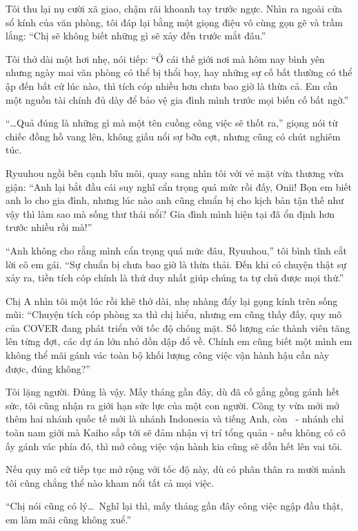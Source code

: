 \documentclass[../main.tex]{subfiles}
\begin{document}
Tôi thu lại nụ cười xã giao, chậm rãi khoanh tay trước ngực. Nhìn ra ngoài cửa sổ kính của văn phòng, tôi đáp lại bằng một giọng điệu vô cùng gọn gẽ và trầm lắng: ``Chị sẽ không biết những gì sẽ xảy đến trước mắt đâu.''

Tôi thở dài một hơi nhẹ, nói tiếp: ``Ở cái thế giới nơi mà hôm nay bình yên nhưng ngày mai văn phòng có thể bị thổi bay, hay những sự cố bất thường có thể ập đến bất cứ lúc nào, thì tích cóp nhiều hơn chưa bao giờ là thừa cả. Em cần một nguồn tài chính đủ dày để bảo vệ gia đình mình trước mọi biến cố bất ngờ.''

``\dots Quả đúng là những gì mà một tên cuồng công việc sẽ thốt ra,'' giọng nói từ chiếc đồng hồ vang lên, không giấu nổi sự bỡn cợt, nhưng cũng có chút nghiêm túc.

Ryuuhou ngồi bên cạnh bĩu môi, quay sang nhìn tôi với vẻ mặt vừa thương vừa giận: ``Anh lại bắt đầu cái suy nghĩ cẩn trọng quá mức rồi đấy, Onii! Bọn em biết anh lo cho gia đình, nhưng lúc nào anh cũng chuẩn bị cho kịch bản tận thế như vậy thì làm sao mà sống thư thái nổi? Gia đình mình hiện tại đã ổn định hơn trước nhiều rồi mà!''

``Anh không cho rằng mình cẩn trọng quá mức đâu, Ryuuhou,'' tôi bình tĩnh cắt lời cô em gái. ``Sự chuẩn bị chưa bao giờ là thừa thải. Đến khi có chuyện thật sự xảy ra, tiền tích cóp chính là thứ duy nhất giúp chúng ta tự chủ được mọi thứ.''

Chị A nhìn tôi một lúc rồi khẽ thở dài, nhẹ nhàng đẩy lại gọng kính trên sống mũi: ``Chuyện tích cóp phòng xa thì chị hiểu, nhưng em cũng thấy đấy, quy mô của COVER đang phát triển với tốc độ chóng mặt. Số lượng các thành viên tăng lên từng đợt, các dự án lớn nhỏ dồn dập đổ về. Chính em cũng biết một mình em không thể mãi gánh vác toàn bộ khối lượng công việc vận hành hậu cần này được, đúng không?''

Tôi lặng người. Đúng là vậy. Mấy tháng gần đây, dù đã cố gắng gồng gánh hết sức, tôi cũng nhận ra giới hạn sức lực của một con người. Công ty vừa mới mở thêm hai nhánh quốc tế mới là nhánh Indonesia và tiếng Anh, còn \hls\ - nhánh chỉ toàn nam giới mà Kaiho sắp tới sẽ đảm nhận vị trí tổng quản - nếu không có cô ấy gánh vác phía đó, thì mớ công việc vận hành kia cũng sẽ dồn hết lên vai tôi.

Nếu quy mô cứ tiếp tục mở rộng với tốc độ này, dù có phân thân ra mười mảnh tôi cũng chẳng thể nào kham nổi tất cả mọi việc.

``Chị nói cũng có lý\dots\ Nghĩ lại thì, mấy tháng gần đây công việc ngập đầu thật, em làm mãi cũng không xuể.''
\end{document}
